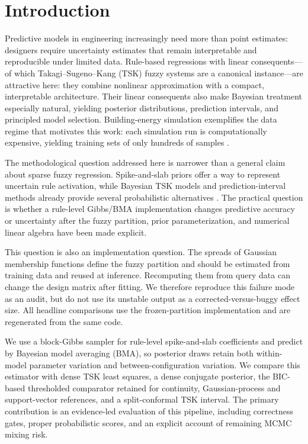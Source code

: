 \documentclass[1p,times]{elsarticle}
\begin{document}
\section{Introduction}
\label{sec:introduction}

Predictive models in engineering increasingly need more than point estimates: designers require uncertainty estimates that remain interpretable and reproducible under limited data.
Rule-based regressions with linear consequents---of which Takagi--Sugeno--Kang (TSK) fuzzy systems \cite{takagi1985fuzzy} are a canonical instance---are attractive here: they combine nonlinear approximation with a compact, interpretable architecture.
Their linear consequents also make Bayesian treatment especially natural, yielding posterior distributions, prediction intervals, and principled model selection. Building-energy simulation exemplifies the data regime that motivates this work: each simulation run is computationally expensive, yielding training sets of only hundreds of samples \cite{tsanas2012accurate}.

The methodological question addressed here is narrower than a general claim about sparse fuzzy regression.
Spike-and-slab priors \cite{mitchell1988bayesian,george1993variable} offer a way to represent uncertain rule activation, while Bayesian TSK models and prediction-interval methods already provide several probabilistic alternatives \cite{gu2017bayesian,gu2018bayesian,liu2017bayesianzero,miskony2018predictionintervals}.
The practical question is whether a rule-level Gibbs/BMA implementation changes predictive accuracy or uncertainty after the fuzzy partition, prior parameterization, and numerical linear algebra have been made explicit.

This question is also an implementation question.
The spreads of Gaussian membership functions define the fuzzy partition and should be estimated from training data and reused at inference.
Recomputing them from query data can change the design matrix after fitting.
We therefore reproduce this failure mode as an audit, but do not use its unstable output as a corrected-versus-buggy effect size.
All headline comparisons use the frozen-partition implementation and are regenerated from the same code.

We use a block-Gibbs sampler for rule-level spike-and-slab coefficients and predict by Bayesian model averaging (BMA), so posterior draws retain both within-model parameter variation and between-configuration variation.
We compare this estimator with dense TSK least squares, a dense conjugate posterior, the BIC-based thresholded comparator retained for continuity, Gaussian-process and support-vector references, and a split-conformal TSK interval.
The primary contribution is an evidence-led evaluation of this pipeline, including correctness gates, proper probabilistic scores, and an explicit account of remaining MCMC mixing risk.
\end{document}
